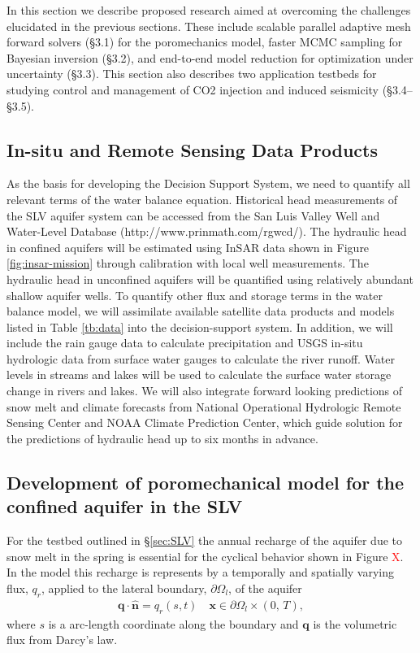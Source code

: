 \documentclass[11pt,final]{article}%
\newcommand{\note}[1]{\textcolor{red}{ #1}}
\begin{document}
In this section we describe proposed research aimed at overcoming the challenges elucidated in the previous sections. These include scalable parallel adaptive mesh forward solvers (§3.1) for the poromechanics model, faster MCMC sampling for Bayesian inversion (§3.2), and end-to-end model reduction for optimization under uncertainty (§3.3). This section also describes two application testbeds for studying control and management of CO2 injection and induced seismicity (§3.4–§3.5).


\subsection{In-situ and Remote Sensing Data Products}
As the basis for developing the Decision Support System, we need to quantify all relevant terms of the water balance equation. Historical head measurements of the SLV aquifer system can be accessed from the San Luis Valley Well and Water-Level Database (http://www.prinmath.com/rgwcd/). The hydraulic head in confined aquifers will be estimated using InSAR data shown in Figure \ref{fig:insar-mission} through calibration with local well measurements. The hydraulic head in unconfined aquifers will be quantified using relatively abundant shallow aquifer wells. To quantify other flux and storage terms in the water balance model, we will assimilate available satellite data products and models listed in Table \ref{tb:data} into the decision-support system. In addition, we will include the rain gauge data to calculate precipitation and USGS in-situ hydrologic data from surface water gauges to calculate the river runoff. Water levels in streams and lakes will be used to calculate the surface water storage change in rivers and lakes. We will also integrate forward looking predictions of snow melt and climate forecasts from National Operational Hydrologic Remote Sensing Center and NOAA Climate Prediction Center, which guide solution for the predictions of hydraulic head up to six months in advance.

\subsection{Development of poromechanical model for the confined aquifer in the SLV}\label{sec:proposed forward}

For the testbed outlined in \S\ref{sec:SLV} the annual recharge of the aquifer due to snow melt in the spring is essential for the cyclical behavior shown in Figure \note{X}. In the model this recharge is represents by a temporally and spatially varying flux, $q_r$, applied to the lateral boundary, $\partial\Omega_l$, of the aquifer
\begin{align}
    \mathbf{q}\cdot\hat{\mathbf{n}} = q_r(s,t)\quad \mathbf{x} \in \partial\Omega_l \times (0,\,T),
\end{align}
where $s$ is a arc-length coordinate along the boundary and $\mathbf{q}$ is the volumetric flux from Darcy's law.
\end{document}

